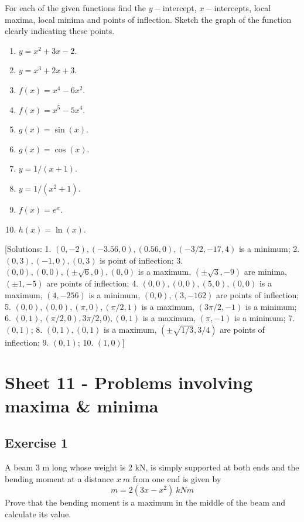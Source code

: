 \documentclass[
  english,
  11pt,
  oneside]{book}
\providecommand{\tightlist}{%
  \setlength{\itemsep}{0pt}\setlength{\parskip}{0pt}}
\newcommand{\slide}{}
\theoremstyle{definition}
\theoremstyle{definition}
\theoremstyle{definition}
\theoremstyle{definition}
\theoremstyle{remark}
\begin{document}
For each of the given functions find the \(y-\)intercept, \(x-\)intercepts, local maxima, local minima
and points of inflection. Sketch the graph of the function clearly indicating these points.

\begin{enumerate}
\def\labelenumi{\arabic{enumi}.}
\tightlist
\item
  \(y=x^2+3x-2\).
\item
  \(y=x^3+2x+3\).
\item
  \(f(x)=x^4-6x^2\).
\item
  \(f(x)=x^5-5x^4\).
\item
  \(g(x)=\sin(x)\).
\item
  \(g(x)=\cos(x)\).
\item
  \(y=1/(x+1)\).
\item
  \(y=1/(x^2+1)\).
\item
  \(f(x)=e^x\).
\item
  \(h(x)=\ln(x)\).
\end{enumerate}

{[}Solutions: 1. \((0,-2), (-3.56,0), (0.56,0), (-3/2,-17,4)\) is a minimum; 2. \((0,3), (-1,0), (0,3)\) is point of inflection; 3. \((0,0), (0,0), (\pm\sqrt{6},0), (0,0)\) is a maximum, \((\pm\sqrt{3},-9)\) are minima, \((\pm 1,-5)\) are points of inflection; 4. \((0,0), (0,0), (5,0), (0,0)\) is a maximum, \((4,-256)\) is a minimum, \((0,0), (3,-162)\) are points of inflection; 5. \((0,0), (0,0), (\pi,0), (\pi/2,1)\) is a maximum, \((3\pi/2,-1)\) is a minimum; 6. \((0,1), (\pi/2,0), 3\pi/2,0), (0,1)\) is a maximum, \((\pi,-1)\) is a minimum; 7. \((0,1)\); 8. \((0,1), (0,1)\) is a maximum, \((\pm\sqrt{1/3},3/4)\) are points of inflection; 9. \((0,1)\); 10. \((1,0)\){]}
\slide

\section{Sheet 11 - Problems involving maxima \& minima}\label{sheet-11---problems-involving-maxima-minima}

\subsection*{Exercise 1}\label{exercise-1-4}

A beam 3 m long whose weight is 2 kN, is simply supported at both ends and the bending moment at a distance \(x\ m\) from one end is given by
\[
m = 2(3x - x^2)\ kNm
\]
Prove that the bending moment is a maximum in the middle of the beam and calculate its value.
\end{document}
